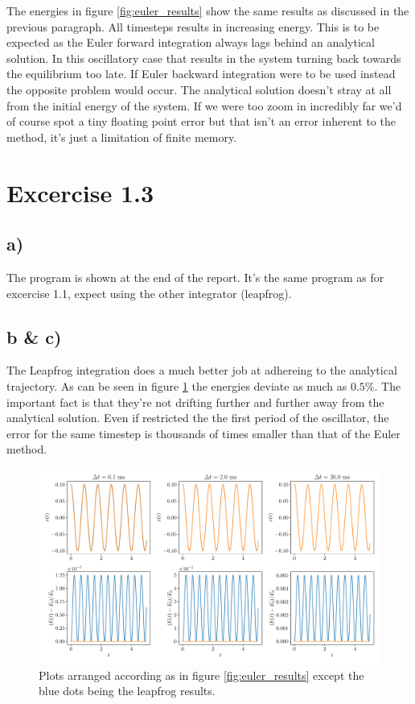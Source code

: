 \documentclass[a4paper, 12pt]{article}
\begin{document}
The energies in figure \ref{fig:euler_results} show the same results as discussed in the previous paragraph. All timesteps results in increasing energy. This is to be expected as the Euler forward integration always lags behind an analytical solution. In this oscillatory case that results in the system turning back towards the equilibrium too late. If Euler backward integration were to be used instead the opposite problem would occur. The analytical solution doesn't stray at all from the initial energy of the system. If we were too zoom in incredibly far we'd of course spot a tiny floating point error but that isn't an error inherent to the method, it's just a limitation of finite memory.

\section*{Excercise 1.3}

\subsection*{a)}
The program is shown at the end of the report. It's the same program as for excercise 1.1, expect using the other integrator (leapfrog).

\subsection*{b \& c)}
The Leapfrog integration does a much better job at adhereing to the analytical trajectory. As can be seen in figure \ref{fig:leapfrog_results} the energies deviate as much as $0.5\%$. The important fact is that they're not drifting further and further away from the analytical solution. Even if restricted the the first period of the oscillator, the error for the same timestep is thousands of times smaller than that of the Euler method.

\begin{figure}[h!]
    \includegraphics[width=\textwidth]{../Harmonic-Oscillator/figures/leapfrog.pdf}
    \caption{Plots arranged according as in figure \ref{fig:euler_results} except the blue dots being the leapfrog results.}
    \label{fig:leapfrog_results}
\end{figure}
\end{document}
